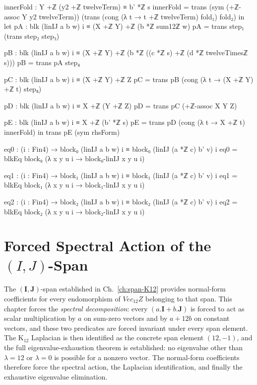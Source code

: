 \documentclass[11pt,a4paper]{book}
\def\cdot{.}%
\def\mathbb#1{#1}%
\def\text#1{#1}%
\begin{document}
\begin{code}
        innerFold : Y +ℤ (y2 +ℤ twelveTerm) ≡ b' *ℤ s
        innerFold =
          trans
            (sym (+ℤ-assoc Y y2 twelveTerm))
            (trans
              (cong (λ t → t +ℤ twelveTerm) fold₁)
              fold₂)
      in
      let
        pA : blk (linIJ a b w) i ≡ (X +ℤ Y) +ℤ (b *ℤ sum12ℤ w)
        pA = trans step₁ (trans step₂ step₃)

        pB : blk (linIJ a b w) i ≡ (X +ℤ Y) +ℤ (b *ℤ ((c *ℤ s) +ℤ (d *ℤ twelveTimesℤ s)))
        pB = trans pA step₄

        pC : blk (linIJ a b w) i ≡ (X +ℤ Y) +ℤ Z
        pC = trans pB (cong (λ t → (X +ℤ Y) +ℤ t) step₈)

        pD : blk (linIJ a b w) i ≡ X +ℤ (Y +ℤ Z)
        pD = trans pC (+ℤ-assoc X Y Z)

        pE : blk (linIJ a b w) i ≡ X +ℤ (b' *ℤ s)
        pE = trans pD (cong (λ t → X +ℤ t) innerFold)
      in
      trans pE (sym rhsForm)

    eq0 : (i : Fin4) → block₀ (linIJ a b w) i ≡ block₀ (linIJ (a *ℤ c) b' v) i
    eq0 = blkEq block₀ (λ x y u i → block₀-linIJ x y u i)

    eq1 : (i : Fin4) → block₁ (linIJ a b w) i ≡ block₁ (linIJ (a *ℤ c) b' v) i
    eq1 = blkEq block₁ (λ x y u i → block₁-linIJ x y u i)

    eq2 : (i : Fin4) → block₂ (linIJ a b w) i ≡ block₂ (linIJ (a *ℤ c) b' v) i
    eq2 = blkEq block₂ (λ x y u i → block₂-linIJ x y u i)
\end{code}


\chapter{Forced Spectral Action of the $(I,J)$-Span}
\label{ch:spectral-action}

The $(\mathbf{I},\mathbf{J})$-span established in Ch.~\ref{ch:span-K12}
provides normal-form coefficients for every endomorphism of $\text{Vec}_{12}\mathbb{Z}$
belonging to that span.
This chapter forces the \emph{spectral decomposition}:
every $(a\!\cdot\!\mathbf{I}+b\!\cdot\!\mathbf{J})$ is forced to act as
scalar multiplication by $a$ on sum-zero vectors and by
$a+12b$ on constant vectors,
and these two predicates are forced invariant under every span element.
The K$_{12}$ Laplacian is then identified as the concrete span element
$(12,-1)$, and the full eigenvalue-exhaustion theorem is established:
no eigenvalue other than $\lambda=12$ or $\lambda=0$ is possible
for a nonzero vector.
The normal-form coefficients therefore force the spectral action, the
Laplacian identification, and finally the exhaustive eigenvalue elimination.
\end{document}
